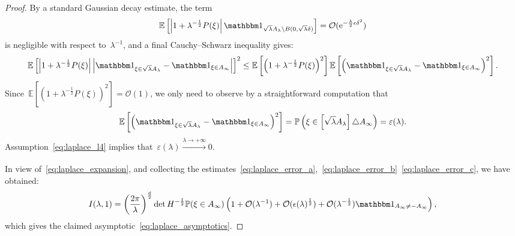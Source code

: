 \documentclass[10pt]{article}
\newcommand{\e}{\mathrm{e}}
\newcommand{\E}{\mathbb{E}}
\renewcommand{\P}{\mathbb{P}}
\newcommand{\1}{\mathbbm 1}
\renewcommand{\O}{\mathcal{O}}
\begin{document}
\begin{proof}
            By a standard Gaussian decay estimate, the term
            \[ \E\left[\left|1 + \lambda^{-\frac12}P(\xi)\right|\1_{\sqrt\lambda A_\lambda \setminus B(0,\sqrt\lambda\delta)}\right] = \O(\e^{-\frac{\lambda}2\epsilon \delta^2})\]
            is negligible with respect to~$\lambda^{-1}$, and a final Cauchy--Schwarz inequality gives:
            \[\E\left[\left|1 + \lambda^{-\frac12}P(\xi)\right|\left|\1_{\xi\in\sqrt\lambda A_\lambda}-\1_{\xi \in A_\infty}\right|\right]^2 \leq \E\left[\left(1 + \lambda^{-\frac12}P(\xi)\right)^2\right]\E\left[\left(\1_{\xi\in\sqrt\lambda A_\lambda}-\1_{\xi \in A_\infty}\right)^2\right].\]
            Since~$\E\left[\left(1 + \lambda^{-\frac12}P(\xi)\right)^2\right] = \O(1)$, we only need to observe by a straightforward computation that
            \begin{equation}
                \label{eq:laplace_error_c}
                \E\left[\left(\1_{\xi\in\sqrt\lambda A_\lambda}-\1_{\xi \in A_\infty}\right)^2\right] = \P\left(\xi \in \left[\sqrt\lambda A_\lambda\right]\triangle A_\infty\right) = \varepsilon(\lambda).
            \end{equation}
            Assumption~\eqref{eq:laplace_l4} implies that~$\varepsilon(\lambda) \xrightarrow[]{\lambda \to +\infty} 0$.
        
            In view of~\eqref{eq:laplace_expansion}, and collecting the estimates~\eqref{eq:laplace_error_a},~\eqref{eq:laplace_error_b}~\eqref{eq:laplace_error_c}, we have obtained:
            \begin{equation}
                I(\lambda,1) = \left(\frac{2\pi}{\lambda}\right)^{\frac d2}\det H^{-\frac12}\P(\xi \in A_\infty)\left(1+\O(\lambda^{-1})+\O(\epsilon(\lambda)^{\frac12})+ \O(\lambda^{-\frac 12})\1_{A_\infty \neq - A_\infty}\right),
            \end{equation}
            which gives the claimed asymptotic~\eqref{eq:laplace_asymptotics}.
        \end{proof}
\end{document}
